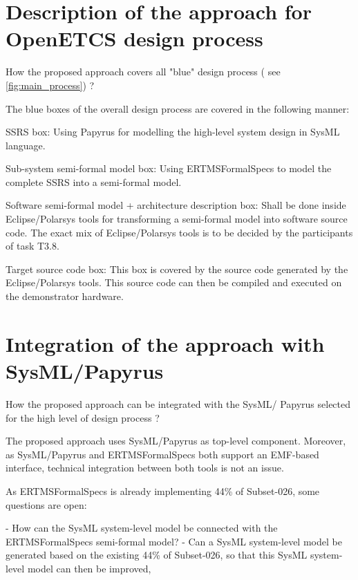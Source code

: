 \section{Description of the approach for OpenETCS design process}

\begin{todo_comment}
How the proposed approach covers all "blue" design process ( see \ref{fig:main_process}) ?
\end{todo_comment}

The blue boxes of the overall design process are covered in the following manner:

SSRS box: Using Papyrus for modelling the high-level system design in SysML language. 

Sub-system semi-formal model box: Using ERTMSFormalSpecs to model the complete SSRS into a semi-formal model.

Software semi-formal model + architecture description box: Shall be done inside Eclipse/Polarsys tools for transforming a semi-formal model 
into software source code. The exact mix of Eclipse/Polarsys tools is to be decided by the participants of task T3.8. 

Target source code box: This box is covered by the source code generated by the Eclipse/Polarsys tools. This source code can then be compiled and executed on the demonstrator hardware. 

\section{Integration of the approach with SysML/Papyrus}

\begin{todo_comment}
How the proposed approach can be integrated with the SysML/ Papyrus selected for the high level of design process ?
\end{todo_comment}

The proposed approach uses SysML/Papyrus as top-level component. Moreover, as SysML/Papyrus and ERTMSFormalSpecs both support an EMF-based interface, 
technical integration between both tools is not an issue.

As ERTMSFormalSpecs is already implementing 44\% of Subset-026, some questions are open:

- How can the SysML system-level model be connected with the ERTMSFormalSpecs semi-formal model? 
- Can a SysML system-level model be generated based on the existing 44\% of Subset-026, so that this SysML system-level model 
can then be improved, 


